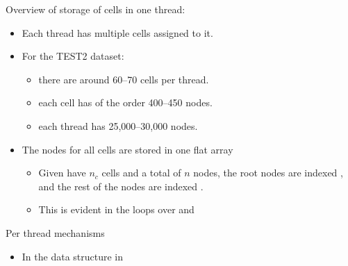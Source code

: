 \noindent
Overview of storage of cells in one thread:
\begin{itemize}
\item
    Each thread has multiple cells assigned to it.
\item
    For the TEST2 dataset:
    \begin{itemize}
    \item
        there are around 60--70 cells per thread.
    \item
        each cell has of the order 400--450 nodes.
    \item
        each thread has 25,000--30,000 nodes.
    \end{itemize}
\item
    The nodes for all cells are stored in one flat array
    \begin{itemize}
    \item
        Given have $n_c$ cells and a total of $n$ nodes, the root nodes are indexed \lst{[1:n_c]}, and the rest of the nodes are indexed \lst{[n_c+1:n]}.
    \item
        This is evident in the loops over  and 
    \end{itemize}
\end{itemize}


\noindent
Per thread mechanisms
\begin{itemize}
\item
    In the  data structure in \fig{}
\end{itemize}

